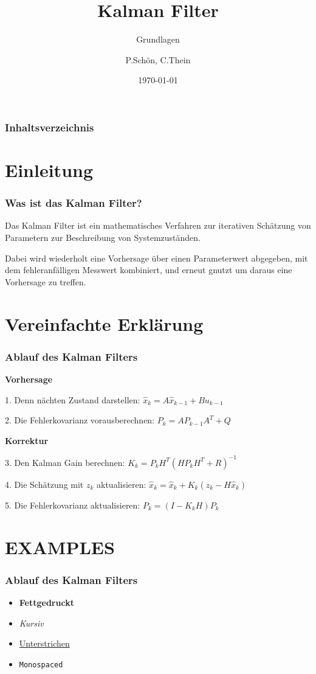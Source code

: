 \documentclass{beamer}
\title{Kalman Filter}
\subtitle{Grundlagen}
\author{P.Schön, C.Thein}
\date{\today}
\begin{document}
\frame{\titlepage}

\begin{frame}
    \frametitle{Inhaltsverzeichnis}
    \tableofcontents
\end{frame}

\section{Einleitung}

\begin{frame}
    \frametitle{Was ist das Kalman Filter?}
    Das Kalman Filter ist ein mathematisches Verfahren zur iterativen Schätzung von Parametern zur
    Beschreibung von Systemzuständen.

    Dabei wird wiederholt eine Vorhersage über einen Parameterwert
    abgegeben, mit dem fehleranfälligen Messwert kombiniert, und erneut gnutzt um daraus eine Vorhersage
    zu treffen.
\end{frame}

\section{Vereinfachte Erklärung}




\begin{frame}
    \frametitle{Ablauf des Kalman Filters}

    \textbf{Vorhersage}

    1. Denn nächten Zustand darstellen: \( \hat{x}_{k} = A\hat{x}_{k-1}+Bu_{k-1} \)

    2. Die Fehlerkovarianz vorausberechnen: \( P_{k}=AP_{k-1}A^{T}+Q \)

    \textbf{Korrektur}

    3. Den Kalman Gain berechnen: \( K_{k}=P_{k}H^{T}(HP_{k}H^T+R)^{-1} \)

    4. Die Schätzung mit \(z_k\) aktualisieren: \( \hat{x}_{k}=\hat{x}_{k}+K_{k}(z_{k}-H\hat{x}_{k}) \)

    5. Die Fehlerkovarianz aktualisieren: \( P_{k}=(I-K_{k}H)P_{k} \)
\end{frame}


\section{EXAMPLES}

\begin{frame}
    \frametitle{Ablauf des Kalman Filters}
    \begin{itemize}
        \item \textbf{Fettgedruckt}
        \item \textit{Kursiv}
        \item \underline{Unterstrichen}
        \item \texttt{Monospaced}
    \end{itemize}
\end{frame}
\end{document}
